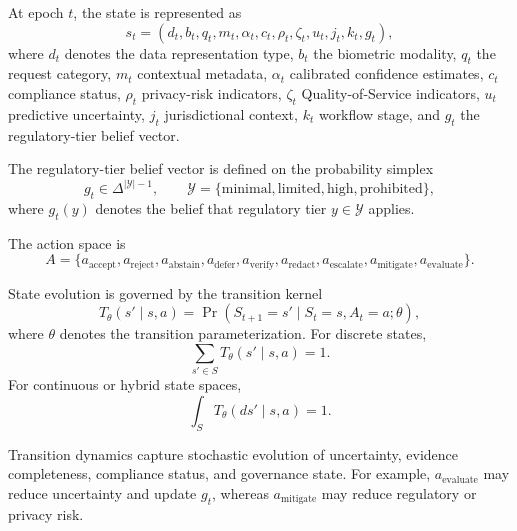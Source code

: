 \documentclass{article}
\begin{document}
At epoch \(t\), the state is represented as
\begin{equation}
s_t=(d_t,b_t,q_t,m_t,\alpha_t,c_t,\rho_t,\zeta_t,u_t,j_t,k_t,g_t),
\end{equation}
where \(d_t\) denotes the data representation type, \(b_t\) the biometric modality, \(q_t\) the request category, \(m_t\) contextual metadata, \(\alpha_t\) calibrated confidence estimates, \(c_t\) compliance status, \(\rho_t\) privacy-risk indicators, \(\zeta_t\) Quality-of-Service indicators, \(u_t\) predictive uncertainty, \(j_t\) jurisdictional context, \(k_t\) workflow stage, and \(g_t\) the regulatory-tier belief vector.

The regulatory-tier belief vector is defined on the probability simplex
\begin{equation}
g_t\in\Delta^{|\mathcal{Y}|-1},
\qquad
\mathcal{Y}=
\{\mathrm{minimal},\mathrm{limited},\mathrm{high},\mathrm{prohibited}\},
\end{equation}
where \(g_t(y)\) denotes the belief that regulatory tier \(y\in\mathcal{Y}\) applies.

The action space is
\begin{equation}
A=
\{
a_{\mathrm{accept}},
a_{\mathrm{reject}},
a_{\mathrm{abstain}},
a_{\mathrm{defer}},
a_{\mathrm{verify}},
a_{\mathrm{redact}},
a_{\mathrm{escalate}},
a_{\mathrm{mitigate}},
a_{\mathrm{evaluate}}
\}.
\end{equation}

State evolution is governed by the transition kernel
\begin{equation}
T_{\theta}(s'\mid s,a)
=
\Pr(S_{t+1}=s'\mid S_t=s,A_t=a;\theta),
\end{equation}
where \(\theta\) denotes the transition parameterization. For discrete states,
\begin{equation}
\sum_{s'\in S}T_{\theta}(s'\mid s,a)=1.
\end{equation}
For continuous or hybrid state spaces,
\begin{equation}
\int_S T_{\theta}(ds'\mid s,a)=1.
\end{equation}

Transition dynamics capture stochastic evolution of uncertainty, evidence completeness, compliance status, and governance state. For example, \(a_{\mathrm{evaluate}}\) may reduce uncertainty and update \(g_t\), whereas \(a_{\mathrm{mitigate}}\) may reduce regulatory or privacy risk.
\end{document}
